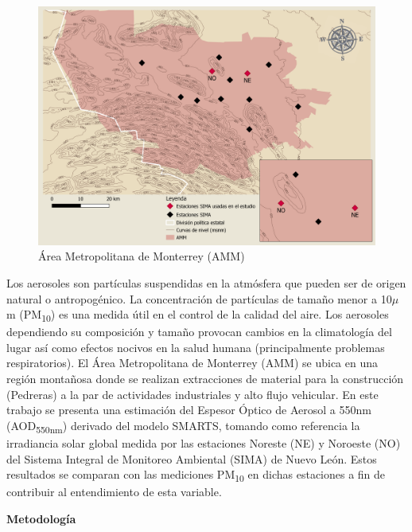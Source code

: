 \documentclass{article}
\begin{document}
\vspace*{-0.5cm}
\begin{minipage}{0.4\linewidth}
\begin{figure}[H]
\centering
\includegraphics[scale=0.29]{images/AMM10.png}
\caption{Área Metropolitana de Monterrey (AMM)}
\end{figure}
\end{minipage}
\begin{minipage}{0.60\linewidth}
    Los aerosoles son partículas suspendidas en la atmósfera que pueden ser de origen natural o antropogénico. 
    La concentración de partículas de tamaño menor a 10$\mu$m (PM\textsubscript{10}) es una medida útil en el control de la calidad del aire. 
    Los aerosoles dependiendo su composición y tamaño provocan cambios en la climatología del lugar así como efectos nocivos en la 
    salud humana (principalmente problemas respiratorios). El Área Metropolitana de Monterrey (AMM) se ubica en una región montañosa 
    donde se realizan extracciones de material para la construcción (Pedreras) a la par de actividades industriales y alto flujo 
    vehicular. En este trabajo se presenta una estimación del Espesor Óptico de Aerosol a 550nm (AOD\textsubscript{550nm}) derivado del modelo SMARTS, 
    tomando como referencia la irradiancia solar global medida por las estaciones Noreste (NE) y Noroeste (NO) del Sistema Integral de 
    Monitoreo Ambiental (SIMA) de Nuevo León. 
    Estos resultados se comparan con las mediciones PM\textsubscript{10} en dichas estaciones a fin de contribuir al entendimiento de esta variable.
\end{minipage}
\begin{center}
\begin{shaded}
\textbf{\textcolor{ver}{Metodología}}
\end{shaded}
\end{center}
\end{document}
